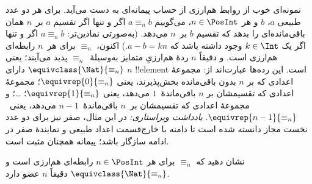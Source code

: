 \documentclass[../../../include/open-logic-section]{subfiles}
\begin{document}
\begin{ex}
نمونه‌ای خوب از روابط هم‌ارزی از حساب پیمانه‌ای به دست می‌آید. برای هر دو عدد طبیعی $a$، $b$ و هر $n \in \PosInt$، می‌گوییم $a \equiv_n b$ اگر و تنها اگر
تقسیم $a$ بر~$n$ همان باقی‌مانده‌ای را بدهد که تقسیم $b$ بر~$n$ می‌دهد.
(به‌صورتی نمادین‌تر: $a \equiv_n b$ اگر و تنها اگر یک $k \in
\Int$ وجود داشته باشد که $a - b = kn$.) اکنون، $\equiv_n$ برای
هر~$n$ رابطه‌ای هم‌ارزی است. و دقیقاً $n$ ردهٔ هم‌ارزیِ متمایز
به‌وسیلهٔ~$\equiv_n$ پدید می‌آیند؛ یعنی $\equivclass{\Nat}{\equiv_n}$
دارای $n$ !!{element} است. این رده‌ها عبارت‌اند از: مجموعهٔ اعدادی که
بر $n$ بدون باقی‌مانده بخش‌پذیرند، یعنی $\equivrep{0}{\equiv_n}$؛
مجموعهٔ اعدادی که تقسیمشان بر $n$ باقی‌ماندهٔ~$1$ می‌دهد، یعنی
$\equivrep{1}{\equiv_n}$؛ \ldots؛ و مجموعهٔ اعدادی که تقسیمشان بر~$n$
باقی‌ماندهٔ~$n-1$ می‌دهد، یعنی~$\equivrep{n-1}{\equiv_n}$.
\emph{یادداشت ویراستاری:} در این مثال، صفر نیز برای دو عدد نخست مجاز دانسته شده است تا دامنه با خارج‌قسمت اعداد طبیعی و نمایندهٔ صفر در ادامه سازگار باشد؛ پیمانه همچنان مثبت است.
\end{ex}

\begin{prob}
نشان دهید که $\equiv_n$ برای هر $n \in
\PosInt$ رابطه‌ای هم‌ارزی است و
$\equivclass{\Nat}{\equiv_n}$ دقیقاً $n$ عضو دارد.
\end{prob}
\end{document}
